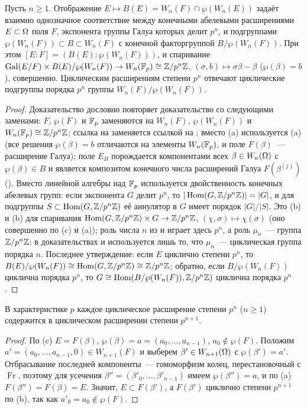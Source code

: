 \begin{theorem}[5.32t]
Пусть $n\ge1$. Отображение $E\mapsto B(E)=W_n(F)\cap\wp(W_n(E))$ задаёт взаимно однозначное соответствие между конечными
абелевыми расширениями $E\subset\Omega$ поля $F$, экспонента группы Галуа которых делит $p^n$, и подгруппами
$\wp(W_n(F))\subset B\subset W_n(F)$ с конечной факторгруппой $B/\wp(W_n(F))$. При этом $[E:F]=(B(E):\wp(W_n(F)))$, и
спаривание $\operatorname{Gal}(E/F)\times B(E)/\wp(W_n(F))\to W_n(\mathbb F_p)\cong\mathbb Z/p^n\mathbb Z$, $(\sigma,b)\mapsto\sigma\beta-\beta$ ($\wp(\beta)=b$),
совершенно. Циклическим расширениям степени $p^n$ отвечают циклические подгруппы порядка $p^n$ группы
$W_n(F)/\wp(W_n(F))$.
\end{theorem}

\begin{proof}
Доказательство дословно повторяет доказательство  со следующими заменами: $F$, $\wp(F)$ и $\mathbb F_p$ заменяются на
$W_n(F)$, $\wp(W_n(F))$ и $W_n(\mathbb F_p)\cong\mathbb Z/p^n\mathbb Z$; ссылка на  заменяется ссылкой на ; вместо (a)
используется (a) (все решения $\wp(\beta)=b$ отличаются на элементы $W_n(\mathbb F_p)$, и поле $F(\beta)$~--- расширение
Галуа); поле $E_B$ порождается компонентами всех $\beta\in W_n(\Omega)$ с $\wp(\beta)\in B$ и является композитом конечного
числа расширений Галуа $F(\beta^{(j)})$ (). Вместо линейной алгебры над $\mathbb F_p$ используется двойственность конечных
абелевых групп: если экспонента $G$ делит $p^n$, то $|\operatorname{Hom}(G,\mathbb Z/p^n\mathbb Z)|=|G|$, и для подгруппы $S\subset\operatorname{Hom}(G,\mathbb Z/p^n\mathbb Z)$
её аннулятор в $G$ имеет порядок $|G|/|S|$. Это (b) и (b) для спаривания
$\operatorname{Hom}(G,\mathbb Z/p^n\mathbb Z)\times G\to\mathbb Z/p^n\mathbb Z$, $(\chi,\sigma)\mapsto\chi(\sigma)$ (оно совершенно по (c) и (a)); роль
числа $n$ из  и  играет здесь $p^n$, а роль $\mu_n$~--- группа $\mathbb Z/p^n\mathbb Z$: в доказательствах  и 
используется лишь то, что $\mu_n$~--- циклическая группа порядка $n$. Последнее утверждение: если $E$ циклично степени
$p^n$, то
$B(E)/\wp(W_n(F))\cong\operatorname{Hom}(G,\mathbb Z/p^n\mathbb Z)\cong\mathbb Z/p^n\mathbb Z$; обратно, если $B/\wp(W_n(F))$ циклична порядка $p^n$, то
$G\cong\operatorname{Hom}(B/\wp(W_n(F)),\mathbb Z/p^n\mathbb Z)$ циклична порядка $p^n$.
\end{proof}

\begin{corollary}[5.32u]
В характеристике $p$ каждое циклическое расширение степени $p^n$ ($n\ge1$) содержится в циклическом расширении степени
$p^{n+1}$.
\end{corollary}

\begin{proof}
По (c) $E=F(\beta)$, $\wp(\beta)=a=(a_0,\dots,a_{n-1})$, $a_0\notin\wp(F)$. Положим $a'=(a_0,\dots,a_{n-1},0)\in W_{n+1}(F)$ и
выберем $\beta'\in W_{n+1}(\Omega)$ с $\wp(\beta')=a'$. Отбрасывание последней компоненты~--- гомоморфизм колец, перестановочный
с $\operatorname{Fr}$, поэтому для усечения $\beta''=(\beta'_0,\dots,\beta'_{n-1})$ имеем $\wp(\beta'')=a$, и по (a)
$F(\beta'')=F(\beta)=E$. Значит, $E\subset F(\beta')$, а $F(\beta')$ циклично степени $p^{n+1}$ по (b), так как $a'_0=a_0\notin\wp(F)$.
\end{proof}

